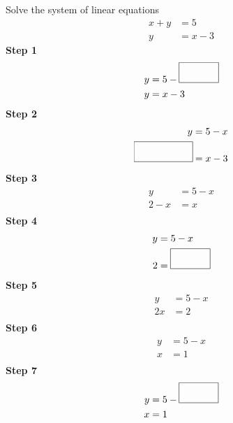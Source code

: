 \documentclass[14pt,letterpaper]{article}
\begin{document}
\begin{exercise}
Solve the system of linear equations
\begin{align*}
x+y&=5\\
y&=x-3
\end{align*}
\hline
\textbf{Step 1}
\begin{align*}
y&=5-\framebox(40,20){}\\
y&=x-3\\
\end{align*}
\hline
\textbf{Step 2}
\begin{align*}
y&=5-x\\
\framebox(60,20){}&=x-3\\
\end{align*}
\hline
\textbf{Step 3}
\begin{align*}
y&=5-x\\
2-x&=x\\
\end{align*}
\hline
\textbf{Step 4}
\begin{align*}
y&=5-x\\
2&=\framebox(40,20){}\\
\end{align*}
\hline
\textbf{Step 5}
\begin{align*}
y&=5-x\\
2x&=2\\
\end{align*}
\hline
\textbf{Step 6}
\begin{align*}
y&=5-x\\
x&=1\\
\end{align*}
\hline
\textbf{Step 7}
\begin{align*}
y&=5-\framebox(40,20){}\\
x&=1\\
\end{align*}
\end{exercise}
\end{document}
